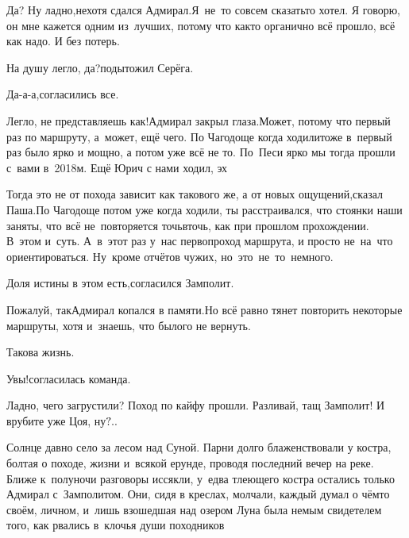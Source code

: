 \diagdash Да? Ну ладно,\mdash нехотя сдался Адмирал.\mdash Я~не~то совсем сказать\sdash то хотел. Я говорю, он мне кажется одним из~лучших, потому что как\sdash то органично всё прошло, всё как надо. И без потерь.

\diagdash На душу легло, да?\mdash подытожил Серёга.

\diagdash Да-а-а,\mdash согласились все.

\diagdash Легло, не представляешь как!\mdash Адмирал закрыл глаза.\mdash Может, потому что первый раз по маршруту, а~может, ещё чего. По Чагодоще когда ходили\mdash тоже в~первый раз было ярко и мощно, а потом уже всё не то. По~Песи ярко мы тогда прошли с~вами в~2018\sdash м. Ещё Юрич с нами ходил, эх\myldots{}

\diagdash Тогда это не от похода зависит как такового же, а от новых ощущений,\mdash сказал Паша.\mdash По Чагодоще потом уже когда ходили, ты расстраивался, что стоянки наши заняты, что всё не~повторяется точь\sdash в\sdash точь, как при прошлом прохождении. В~этом и~суть. А~в~этот раз у~нас первопроход маршрута, и просто не~на~что ориентироваться. Ну~кроме отчётов чужих, но~это~не~то~немного.

\diagdash Доля истины в этом есть,\mdash согласился Замполит.

\diagdash Пожалуй, так\myldots{}\mdash Адмирал копался в памяти.\mdash Но всё равно тянет повторить некоторые маршруты, хотя и~знаешь, что былого не вернуть.

\diagdash Такова жизнь.

\diagdash Увы!\mdash согласилась команда.

\diagdash Ладно, чего загрустили? Поход по кайфу прошли. Разливай, тащ Замполит! И врубите уже Цоя, ну$\quldots$ %

\vspace{1em}
\myldots{}Солнце давно село за лесом над Суной. Парни долго блаженствовали у костра, болтая о походе, жизни и~всякой ерунде, проводя последний вечер на реке. Ближе к~полуночи разговоры иссякли, у~едва тлеющего костра остались только Адмирал с~Замполитом. Они, сидя в креслах, молчали, каждый думал о чём\sdash то своём, личном, и~лишь взошедшая над озером Луна была немым свидетелем того, как рвались в~клочья души походников\myldots{} %


\begin{center}
\end{center}
